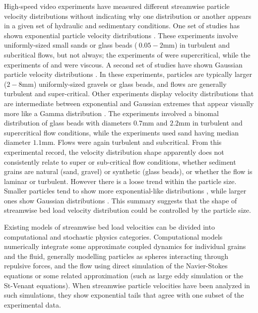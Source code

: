 High-speed video experiments have measured different streamwise particle velocity distributions without indicating why one distribution or another appears in a given set of hydraulic and sedimentary conditions.
One set of studies has shown exponential particle velocity distributions \citep{Charru2004,Lajeunesse2010,Roseberry2012,Seizilles2014,Fathel2015,Fathel2016}.
These experiments involve uniformly-sized small sands or glass beads ($~0.05-2$mm) in turbulent and subcritical flows, but not always; the experiments of \citet{Lajeunesse2010} were supercritical, while the experiments of \citet{Charru2004} and \citet{Seizilles2014} were viscous.
A second set of studies have shown Gaussian particle velocity distributions \citep{Ancey2014,Heyman2016,Martin2012}. In these experiments, particles are typically larger ($2-8$mm) uniformly-sized gravels or glass beads, and flows are generally turbulent and super-critical.
Other experiments display velocity distributions that are intermediate between exponential and Gaussian extremes that appear visually more like a Gamma distribution \citep{Houssais2012, Liu2019}.
The \citet{Houssais2012} experiments involved a binomal distribution of glass beads with diameters $0.7$mm and $2.2$mm in turbulent and supercritical flow conditions, while the \citet{Liu2019} experiments used sand having median diameter $1.1$mm. Flows were again turbulent and subcritical.
From this experimental record, the velocity distribution shape apparently does not consistently relate to super or sub-critical flow conditions, whether sediment grains are natural (sand, gravel) or synthetic (glass beads), or whether the flow is laminar or turbulent.
However there is a loose trend within the particle size. Smaller particles tend to show more exponential-like distributions \citep[e.g.][]{Fathel2015}, while larger ones show Gaussian distributions \citep[e.g.][]{Heyman2016}. This summary suggests that the shape of streamwise bed load velocity distribution could be controlled by the particle size.

Existing models of streamwise bed load velocities can be divided into computational and stochastic physics categories.
Computational models numerically integrate some approximate coupled dynamics for individual grains and the fluid, generally modelling particles as spheres interacting through repulsive forces, and the flow using direct simulation of the Navier-Stokes equations or some related approximation (such as large eddy simulation or the St-Venant equations).
When streamwise particle velocities have been analyzed in such simulations, they show exponential tails \citep{Gonzalez2017,Furbish2013} that agree with one subset of the experimental data.

